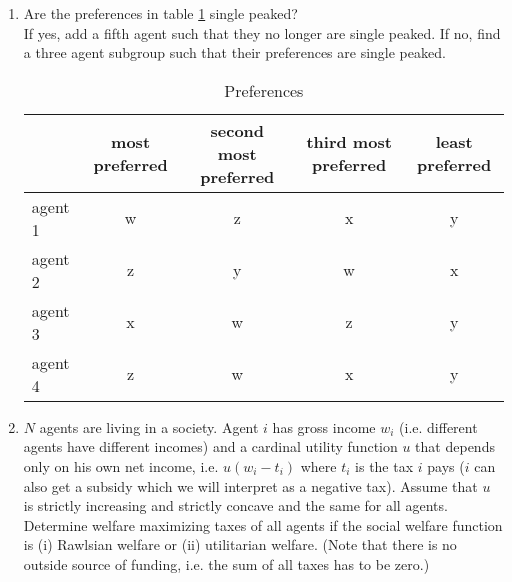 \documentclass[a4paper,12pt]{article}
\begin{document}
\begin{enumerate}
\item Are the preferences in table \ref{tab:singlePeaked} single peaked?\\ If yes, add a fifth agent such that they no longer are single peaked. If no, find a three agent subgroup such that their preferences are single peaked. 
  \begin{table}[h]
    \centering
    \begin{tabular}{l|cccc}
        &most preferred& second most preferred& third most preferred& least preferred\\ \hline
      agent 1& w&z & x & y\\
      agent 2& z&y&w&x\\
      agent 3& x & w & z & y\\
      agent 4& z& w&x& y \\
    \end{tabular}
    \caption{Preferences}
    \label{tab:singlePeaked}
  \end{table}
\item $N$ agents are living in a society. Agent $i$ has gross income $w_i$ (i.e. different agents have different incomes) and a cardinal utility function $u$ that depends only on his own net income, i.e. $u(w_i-t_i)$ where $t_i$ is the tax $i$ pays ($i$ can also get a subsidy which we will interpret as a negative tax). Assume that $u$ is strictly increasing and strictly concave and the same for all agents. Determine welfare maximizing taxes of all agents if the social welfare function is (i) Rawlsian welfare or (ii) utilitarian welfare. (Note that there is no outside source of funding, i.e. the sum of all taxes has to be zero.)\\

\end{enumerate}
\end{document}
